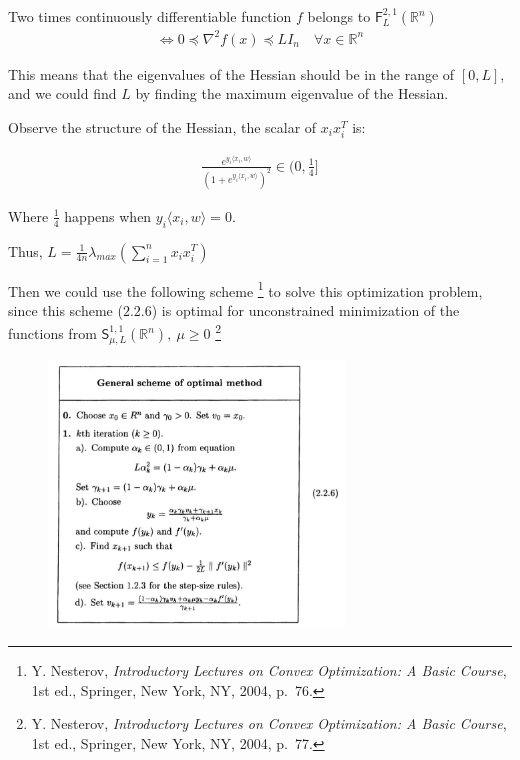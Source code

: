 \documentclass{article}
\begin{document}
\begin{tcolorbox}[greenbox, title = Theorem 2.1.6]
    Two times continuously differentiable function $f$ belongs to $\mathsf{F}^{2,1}_L(\mathbb{R}^n)$ 
    \begin{align*}
        \Leftrightarrow 0 \preceq \nabla^2 f(x) \preceq L I_n \quad \forall x \in \mathbb{R}^n
    \end{align*}
\end{tcolorbox}

This means that the eigenvalues of the Hessian should be in the range of $[0, L]$,
and we could find $L$ by finding the maximum eigenvalue of the Hessian.
\bigskip

Observe the structure of the Hessian, the scalar of $x_i x_i^T$ is:

\begin{align*}
    \frac{ e^{y_i \langle x_i, w \rangle} }{\left( 1 + e^{y_i \langle x_i, w \rangle} \right)^2} \in (0, \frac{1}{4}]
\end{align*}

Where $\frac{1}{4}$ happens when $y_i \langle x_i, w \rangle = 0$.
\bigskip

Thus, $L = \frac{1}{4n} \lambda_{max} (\sum_{i = 1}^n x_i x_i^T)$
\bigskip

Then we could use the following scheme
\footnote{Y. Nesterov, \textit{Introductory Lectures on Convex Optimization: A Basic Course}, 1st ed., Springer, New York, NY, 2004, p.~76.} 
to solve this optimization problem, since this scheme ($2.2.6$) is optimal for unconstrained minimization of the functions from $\mathsf{S}^{1,1}_{\mu, L}(\mathbb{R}^n), \ \mu \geq 0$
\footnote{Y. Nesterov, \textit{Introductory Lectures on Convex Optimization: A Basic Course}, 1st ed., Springer, New York, NY, 2004, p.~77.}

\begin{figure}[H]
    \centering
    \includegraphics[width = 0.7\textwidth]{general_scheme_of_optimal_method.png}
\end{figure}
\end{document}
